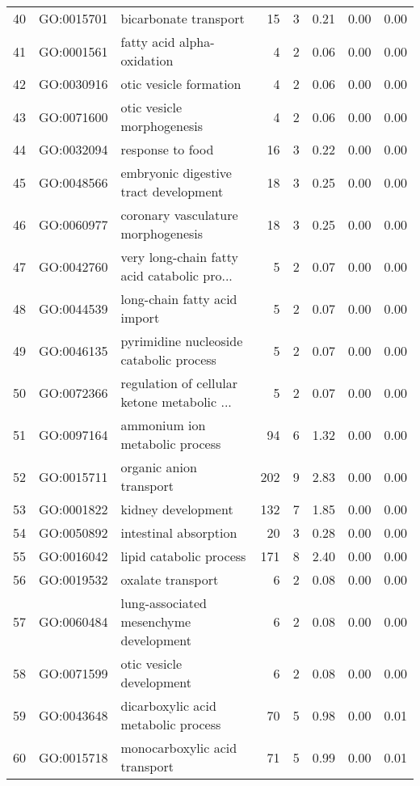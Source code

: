 \begin{table}[ht]
\begin{tabular}{rllrrrrr}
  40 & GO:0015701 & bicarbonate transport &  15 &   3 & 0.21 & 0.00 & 0.00 \\ 
  41 & GO:0001561 & fatty acid alpha-oxidation &   4 &   2 & 0.06 & 0.00 & 0.00 \\ 
  42 & GO:0030916 & otic vesicle formation &   4 &   2 & 0.06 & 0.00 & 0.00 \\ 
  43 & GO:0071600 & otic vesicle morphogenesis &   4 &   2 & 0.06 & 0.00 & 0.00 \\ 
  44 & GO:0032094 & response to food &  16 &   3 & 0.22 & 0.00 & 0.00 \\ 
  45 & GO:0048566 & embryonic digestive tract development &  18 &   3 & 0.25 & 0.00 & 0.00 \\ 
  46 & GO:0060977 & coronary vasculature morphogenesis &  18 &   3 & 0.25 & 0.00 & 0.00 \\ 
  47 & GO:0042760 & very long-chain fatty acid catabolic pro... &   5 &   2 & 0.07 & 0.00 & 0.00 \\ 
  48 & GO:0044539 & long-chain fatty acid import &   5 &   2 & 0.07 & 0.00 & 0.00 \\ 
  49 & GO:0046135 & pyrimidine nucleoside catabolic process &   5 &   2 & 0.07 & 0.00 & 0.00 \\ 
  50 & GO:0072366 & regulation of cellular ketone metabolic ... &   5 &   2 & 0.07 & 0.00 & 0.00 \\ 
  51 & GO:0097164 & ammonium ion metabolic process &  94 &   6 & 1.32 & 0.00 & 0.00 \\ 
  52 & GO:0015711 & organic anion transport & 202 &   9 & 2.83 & 0.00 & 0.00 \\ 
  53 & GO:0001822 & kidney development & 132 &   7 & 1.85 & 0.00 & 0.00 \\ 
  54 & GO:0050892 & intestinal absorption &  20 &   3 & 0.28 & 0.00 & 0.00 \\ 
  55 & GO:0016042 & lipid catabolic process & 171 &   8 & 2.40 & 0.00 & 0.00 \\ 
  56 & GO:0019532 & oxalate transport &   6 &   2 & 0.08 & 0.00 & 0.00 \\ 
  57 & GO:0060484 & lung-associated mesenchyme development &   6 &   2 & 0.08 & 0.00 & 0.00 \\ 
  58 & GO:0071599 & otic vesicle development &   6 &   2 & 0.08 & 0.00 & 0.00 \\ 
  59 & GO:0043648 & dicarboxylic acid metabolic process &  70 &   5 & 0.98 & 0.00 & 0.01 \\ 
  60 & GO:0015718 & monocarboxylic acid transport &  71 &   5 & 0.99 & 0.00 & 0.01 \\ 

\end{tabular}
\end{table}
